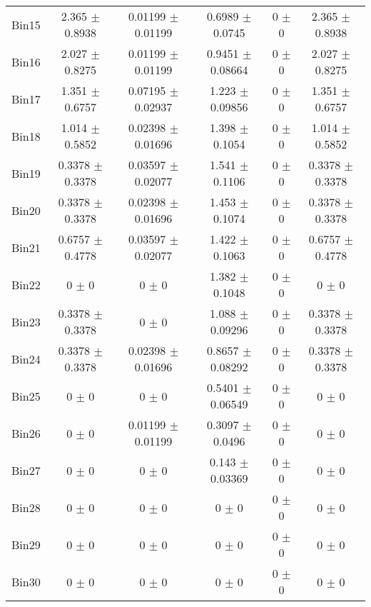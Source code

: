 \begin{tabular}{@{\extracolsep{4pt}}lccccc@{}}
     Bin15 & 2.365 $\pm$ 0.8938 & 0.01199 $\pm$ 0.01199 & 0.6989 $\pm$ 0.0745 & 0 $\pm$ 0 & 2.365 $\pm$ 0.8938 \\ 
     Bin16 & 2.027 $\pm$ 0.8275 & 0.01199 $\pm$ 0.01199 & 0.9451 $\pm$ 0.08664 & 0 $\pm$ 0 & 2.027 $\pm$ 0.8275 \\ 
     Bin17 & 1.351 $\pm$ 0.6757 & 0.07195 $\pm$ 0.02937 & 1.223 $\pm$ 0.09856 & 0 $\pm$ 0 & 1.351 $\pm$ 0.6757 \\ 
     Bin18 & 1.014 $\pm$ 0.5852 & 0.02398 $\pm$ 0.01696 & 1.398 $\pm$ 0.1054 & 0 $\pm$ 0 & 1.014 $\pm$ 0.5852 \\ 
     Bin19 & 0.3378 $\pm$ 0.3378 & 0.03597 $\pm$ 0.02077 & 1.541 $\pm$ 0.1106 & 0 $\pm$ 0 & 0.3378 $\pm$ 0.3378 \\ 
     Bin20 & 0.3378 $\pm$ 0.3378 & 0.02398 $\pm$ 0.01696 & 1.453 $\pm$ 0.1074 & 0 $\pm$ 0 & 0.3378 $\pm$ 0.3378 \\ 
     Bin21 & 0.6757 $\pm$ 0.4778 & 0.03597 $\pm$ 0.02077 & 1.422 $\pm$ 0.1063 & 0 $\pm$ 0 & 0.6757 $\pm$ 0.4778 \\ 
     Bin22 & 0 $\pm$ 0 & 0 $\pm$ 0 & 1.382 $\pm$ 0.1048 & 0 $\pm$ 0 & 0 $\pm$ 0 \\ 
     Bin23 & 0.3378 $\pm$ 0.3378 & 0 $\pm$ 0 & 1.088 $\pm$ 0.09296 & 0 $\pm$ 0 & 0.3378 $\pm$ 0.3378 \\ 
     Bin24 & 0.3378 $\pm$ 0.3378 & 0.02398 $\pm$ 0.01696 & 0.8657 $\pm$ 0.08292 & 0 $\pm$ 0 & 0.3378 $\pm$ 0.3378 \\ 
     Bin25 & 0 $\pm$ 0 & 0 $\pm$ 0 & 0.5401 $\pm$ 0.06549 & 0 $\pm$ 0 & 0 $\pm$ 0 \\ 
     Bin26 & 0 $\pm$ 0 & 0.01199 $\pm$ 0.01199 & 0.3097 $\pm$ 0.0496 & 0 $\pm$ 0 & 0 $\pm$ 0 \\ 
     Bin27 & 0 $\pm$ 0 & 0 $\pm$ 0 & 0.143 $\pm$ 0.03369 & 0 $\pm$ 0 & 0 $\pm$ 0 \\ 
     Bin28 & 0 $\pm$ 0 & 0 $\pm$ 0 & 0 $\pm$ 0 & 0 $\pm$ 0 & 0 $\pm$ 0 \\ 
     Bin29 & 0 $\pm$ 0 & 0 $\pm$ 0 & 0 $\pm$ 0 & 0 $\pm$ 0 & 0 $\pm$ 0 \\ 
     Bin30 & 0 $\pm$ 0 & 0 $\pm$ 0 & 0 $\pm$ 0 & 0 $\pm$ 0 & 0 $\pm$ 0 \\ 
\hline\hline
  \end{tabular}
